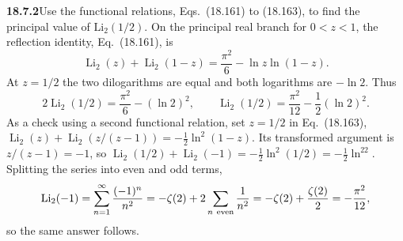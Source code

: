 \par\bigskip
\noindent\textbf{18.7.2}\quad Use the functional relations,
Eqs.~(18.161) to (18.163), to find the principal value of
$\mathrm{Li}_{2}(1/2)$.
\solution
On the principal real branch for $0<z<1$, the reflection identity,
Eq.~(18.161), is
\[
\operatorname{Li}_2(z)+\operatorname{Li}_2(1-z)
 =\frac{\pi^2}{6}-\ln z\ln(1-z).
\]
At $z=1/2$ the two dilogarithms are equal and both logarithms
are $-\ln2$.  Thus
\[
2\operatorname{Li}_2(1/2)=\frac{\pi^2}{6}-(\ln2)^2,
\qquad
\boxed{\operatorname{Li}_2(1/2)=\frac{\pi^2}{12}
                                      -\frac12(\ln2)^2}.
\]
As a check using a second functional relation, set $z=1/2$ in
Eq.~(18.163),
$\operatorname{Li}_2(z)+\operatorname{Li}_2(z/(z-1))
=-\tfrac12\ln^2(1-z)$.  Its transformed argument is
$z/(z-1)=-1$, so
$\operatorname{Li}_2(1/2)+\operatorname{Li}_2(-1)
=-\tfrac12\ln^2(1/2)=-\tfrac12\ln^22$.  Splitting the series
into even and odd terms,
\[
\operatorname{Li}_2(-1)=\sum_{n=1}^\infty\frac{(-1)^n}{n^2}
 =-\zeta(2)+2\sum_{n\ \rm even}\frac1{n^2}
 =-\zeta(2)+\frac{\zeta(2)}2=-\frac{\pi^2}{12},
\]
so the same answer follows.

